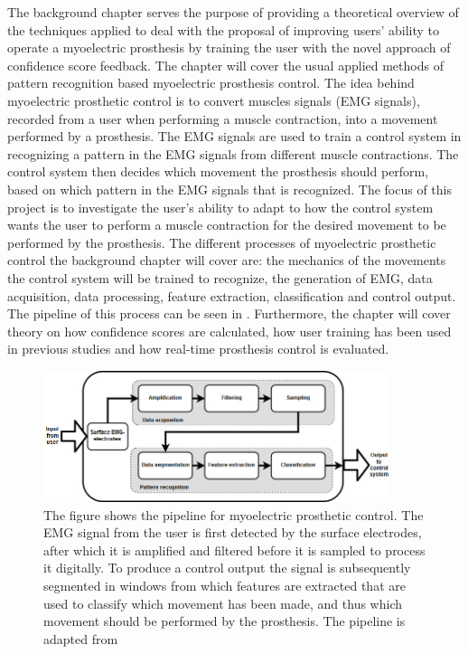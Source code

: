 The background chapter serves the purpose of providing a theoretical overview of the techniques applied to deal with the proposal of improving users' ability to operate a myoelectric prosthesis by training the user with the novel approach of confidence score feedback. The chapter will cover the usual applied methods of pattern recognition based myoelectric prosthesis control. The idea behind myoelectric prosthetic control is to  convert muscles signals (EMG signals), recorded from a user when performing a muscle contraction, into a movement performed by a prosthesis. The EMG signals are used to train a control system in recognizing a pattern in the EMG signals from different muscle contractions. The control system then decides which movement the prosthesis should perform, based on which pattern in the EMG signals that is recognized. The focus of this project is to investigate the user's ability to adapt to how the control system wants the user to perform a muscle contraction for the desired movement to be performed by the prosthesis. The different processes of myoelectric prosthetic control the background chapter will cover are: the mechanics of the movements the control system will be trained to recognize, the generation of EMG, data acquisition, data processing, feature extraction, classification and control output. The pipeline of this process can be seen in . Furthermore, the chapter will cover theory on how confidence scores are calculated, how user training has been used in previous studies and how real-time prosthesis control is evaluated.

\begin{figure}[H] 
	\includegraphics[width=0.9\textwidth]{figures/xBackground/prosthesis_control_pipeline}
	\caption{The figure shows the pipeline for myoelectric prosthetic control. The EMG signal from the user is first detected by the surface electrodes, after which it is amplified and filtered before it is sampled to process it digitally. To produce a control output the signal is subsequently segmented in windows from which features are extracted that are used to classify which movement has been made, and thus which movement should be performed by the prosthesis. The pipeline is adapted from \cite{Peerdeman2011}}
	\label{fig:prothesis_control_pipeline}
\end{figure}